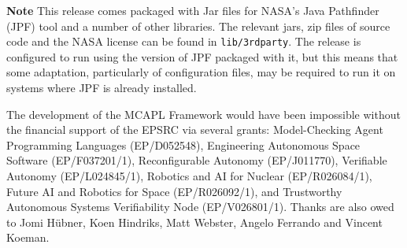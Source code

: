 {\bf Note} This release comes packaged with Jar files for NASA's Java Pathfinder (JPF) tool and a number of other libraries.  The relevant jars, zip files of source code and the NASA license can be found in \texttt{lib/3rdparty}.  The release is configured to run using the version of JPF packaged with it, but this means that some adaptation, particularly of configuration files, may be required to run it on systems where JPF is already installed.

The development of the MCAPL Framework would have been impossible without the financial support of the EPSRC via several grants: Model-Checking Agent Programming Languages (EP/D052548), Engineering Autonomous Space Software (EP/F037201/1), Reconfigurable Autonomy (EP/J011770), Verifiable Autonomy (EP/L024845/1), Robotics and AI for Nuclear (EP/R026084/1), Future AI and Robotics for Space (EP/R026092/1), and Trustworthy Autonomous Systems Verifiability Node (EP/V026801/1).  Thanks are also owed to Jomi H\"{u}bner, Koen Hindriks, Matt Webster, Angelo Ferrando and Vincent Koeman.
